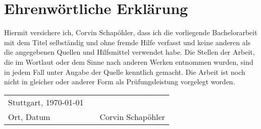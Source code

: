 \chapter{Ehrenwörtliche Erklärung}
Hiermit versichere ich, Corvin Schapöhler, dass ich die vorliegende Bachelorarbeit mit dem Titel \glqq \thetitle\grqq{} selbständig und ohne fremde Hilfe verfasst und keine anderen als die angegebenen Quellen und Hilfsmittel verwendet habe. Die Stellen der Arbeit, die im Wortlaut oder dem Sinne nach anderen Werken entnommen wurden, sind in jedem Fall unter Angabe der Quelle kenntlich gemacht. Die Arbeit ist noch nicht in gleicher oder anderer Form als Prüfungsleistung vorgelegt worden.
\vspace{2cm}

\begin{center}
	\begin{tabular}[h]{lp{2cm}p{5.5cm}}
		Stuttgart, \today & & \\
		\cline{1-1}\cline{3-3}
		Ort, Datum& & Corvin Schapöhler\\
	\end{tabular}
\end{center}
